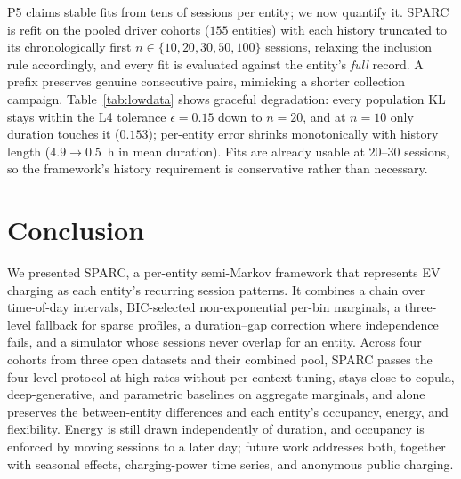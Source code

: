 \documentclass[journal]{IEEEtran}
\begin{document}
P5 claims stable fits from tens of sessions per entity; we now quantify it. SPARC is refit on the pooled driver cohorts ($155$ entities) with each history truncated to its chronologically first $n \in \{10, 20, 30, 50, 100\}$ sessions, relaxing the inclusion rule accordingly, and every fit is evaluated against the entity's \emph{full} record. A prefix preserves genuine consecutive pairs, mimicking a shorter collection campaign. Table~\ref{tab:lowdata} shows graceful degradation: every population KL stays within the L4 tolerance $\epsilon = 0.15$ down to $n = 20$, and at $n = 10$ only duration touches it ($0.153$); per-entity error shrinks monotonically with history length ($4.9 \to 0.5$~h in mean duration). Fits are already usable at $20$--$30$ sessions, so the framework's history requirement is conservative rather than necessary.

\section{Conclusion}
\label{sec:conclusion}
We presented SPARC, a per-entity semi-Markov framework that represents EV charging as each entity's recurring session patterns. It combines a chain over time-of-day intervals, BIC-selected non-exponential per-bin marginals, a three-level fallback for sparse profiles, a duration--gap correction where independence fails, and a simulator whose sessions never overlap for an entity. Across four cohorts from three open datasets and their combined pool, SPARC passes the four-level protocol at high rates without per-context tuning, stays close to copula, deep-generative, and parametric baselines on aggregate marginals, and alone preserves the between-entity differences and each entity's occupancy, energy, and flexibility. Energy is still drawn independently of duration, and occupancy is enforced by moving sessions to a later day; future work addresses both, together with seasonal effects, charging-power time series, and anonymous public charging.



\end{document}
